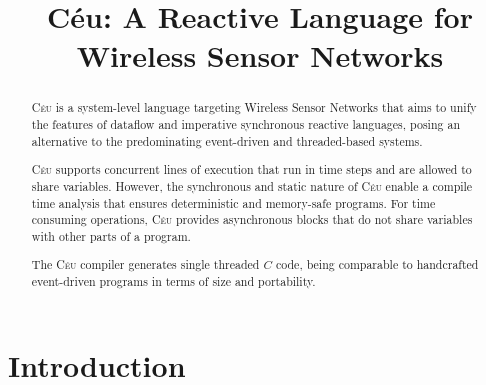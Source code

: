\documentclass{sig-alternate-ipsn09}
\newcommand{\2}{\;\;}
\newcommand{\5}{\;\;\;\;\;}
\newcommand{\CEU}{\textsc{C\'{e}u}}
\begin{document}
\title{C\'eu: A Reactive Language for Wireless Sensor Networks}

\maketitle

\begin{abstract}

\CEU{} is a system-level language targeting Wireless Sensor Networks that aims 
to unify the features of dataflow and imperative synchronous reactive 
languages, posing an alternative to the predominating event-driven and 
threaded-based systems.

\CEU{} supports concurrent lines of execution that run in time steps and are 
allowed to share variables.
However, the synchronous and static nature of \CEU{} enable a compile time 
analysis that ensures deterministic and memory-safe programs.
For time consuming operations, \CEU{} provides asynchronous blocks that do not 
share variables with other parts of a program.

The \CEU{} compiler generates single threaded $C$ code, being comparable to 
handcrafted event-driven programs in terms of size and portability.

\end{abstract}

\section{Introduction}
\label{sec:intro}
\end{document}
